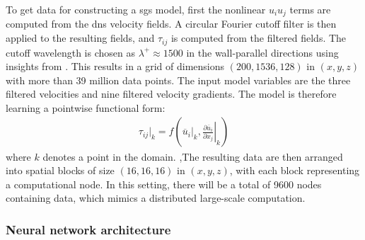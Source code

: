 \documentclass[review]{elsarticle}
\newcommand{\pfrac}[2]{\frac{\partial#1}{\partial#2}}
\newcommand{\ol}[1]{\overline{#1}}
\begin{document}
To get data for constructing a \gls{sgs} model, first the nonlinear $u_i u_j$
terms are computed from the \gls{dns} velocity fields. A circular Fourier
cutoff filter is then applied to the resulting fields, and $\tau_{ij}$ is
computed from the filtered fields.  The cutoff wavelength is chosen as
$\lambda^+\approx1500$ in the wall-parallel directions using insights from
\citet{lee_moser_2019}. This results in a grid of dimensions $(200,1536,128)$ in $(x,y,z)$
with more than 39 million data points. The input model variables are the three
filtered velocities and nine filtered velocity gradients. The model is
therefore learning a pointwise functional form:
\begin{align}
  \label{eq:nn_function_model}
  \tau_{ij}|_k = f\left( \ol{u}_i|_k, \left.\pfrac{\ol{u}_i}{x_j}\right|_k \right)
\end{align}
where $k$ denotes a point in the domain. ,The resulting data are then
arranged into spatial blocks of size $(16,16,16)$ in $(x,y,z)$, with
each block representing a computational node. In this setting, there
will be a total of 9600 nodes containing data, which mimics a
distributed large-scale computation.

\subsubsection{Neural network architecture}
\end{document}
